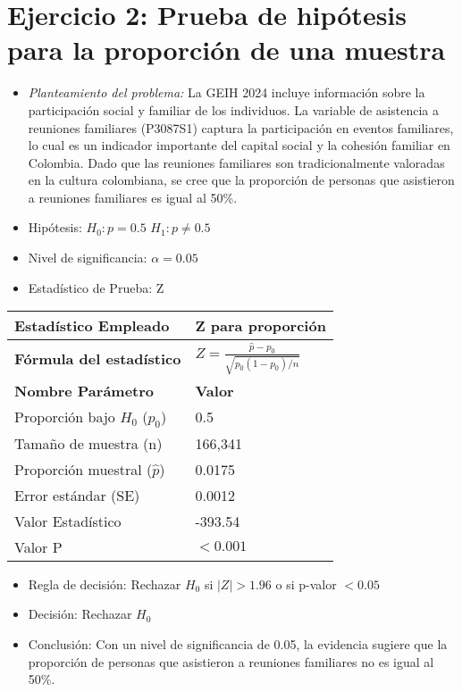 \documentclass[12pt,a4paper]{article}
\begin{document}
\section*{Ejercicio 2: Prueba de hipótesis para la proporción de una muestra}
\begin{itemize}
    \item \textit{Planteamiento del problema:} La GEIH 2024 incluye información sobre la participación social y familiar de los individuos. La variable de asistencia a reuniones familiares (P3087S1) captura la participación en eventos familiares, lo cual es un indicador importante del capital social y la cohesión familiar en Colombia. Dado que las reuniones familiares son tradicionalmente valoradas en la cultura colombiana, se cree que la proporción de personas que asistieron a reuniones familiares es igual al 50\%.
    \item Hipótesis: \quad $H_{0}: p = 0.5$ \hspace{2cm} $H_{1}: p \neq 0.5$
    \item Nivel de significancia: $\alpha = 0.05$
    \item Estadístico de Prueba: Z
\end{itemize}

\begin{tabular}{|m{7cm}|m{7cm}|}
\hline
\textbf{Estadístico Empleado} & Z para proporción \\ \hline
\textbf{Fórmula del estadístico} & $Z = \frac{\hat{p} - p_0}{\sqrt{p_0(1-p_0)/n}}$ \\ \hline
\textbf{Nombre Parámetro} & \textbf{Valor} \\ \hline
Proporción bajo $H_0$ ($p_0$) & 0.5 \\ \hline
Tamaño de muestra (n) & 166,341 \\ \hline
Proporción muestral ($\hat{p}$) & 0.0175 \\ \hline
Error estándar (SE) & 0.0012 \\ \hline
Valor Estadístico & -393.54 \\ \hline
Valor P & $< 0.001$ \\ \hline
\end{tabular}

\begin{itemize}
    \item Regla de decisión: Rechazar $H_0$ si $|Z| > 1.96$ o si p-valor $< 0.05$
    \item Decisión: Rechazar $H_0$
    \item Conclusión: Con un nivel de significancia de 0.05, la evidencia sugiere que la proporción de personas que asistieron a reuniones familiares no es igual al 50\%.
\end{itemize}
\end{document}
